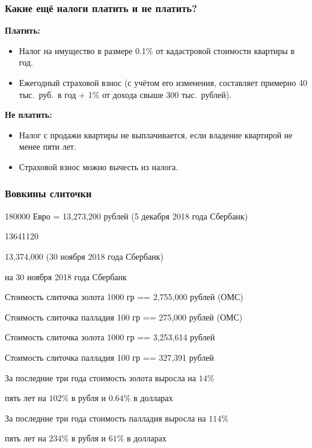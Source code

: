 \documentclass{beamer}
\begin{document}
		\begin{frame}
			\frametitle{Какие ещё налоги платить и не платить?}
			
			\textbf{Платить:}
			\begin{itemize}
			
			\item Налог на имущество в размере 0.1\% от кадастровой стоимости квартиры в год.
			
			\item Ежегодный страховой взнос (с учётом его изменения, составляет примерно 40 тыс.\ руб.\ в год + 1\% от дохода свыше 300 тыс.\ рублей).
			
			\end{itemize}
		
			\textbf{Не платить:}
			\begin{itemize}
			
			\item Налог с продажи квартиры не выплачивается, если владение квартирой не менее пяти лет.
			
			\item Страховой взнос можно вычесть из налога.
			
			\end{itemize}
					
		\end{frame}
		
		\begin{frame}
			\frametitle{Вовкины слиточки}	
		
				180000 Евро = 13,273,200 рублей (5 декабря 2018 года Сбербанк)
							  
							  13641120 
							  
							  13,374,000 (30 ноября 2018 года Сбербанк)
				
				на 30 ноября 2018 года Сбербанк
				
				Стоимость слиточка золота 1000 гр == 2,755,000	рублей (ОМС)
				
				Стоимость слиточка палладия 100 гр == 275,000 рублей	(ОМС)	  
				
				Стоимость слиточка золота 1000 гр == 3,253,614	рублей 
				
				Стоимость слиточка палладия 100 гр == 327,391 рублей
				
				За последние три года стоимость золота выросла на $14\%$
				
				\qquad\qquad\qquad		пять лет на $102\%$	 в рубля и $0.64\%$ в долларах	
					
				За последние три года стоимость палладия выросла на $114\%$
				
				\qquad\qquad\qquad			пять лет на $234\%$	 в рубля и $61\%$ в долларах

		\end{frame}
		
\end{document}
